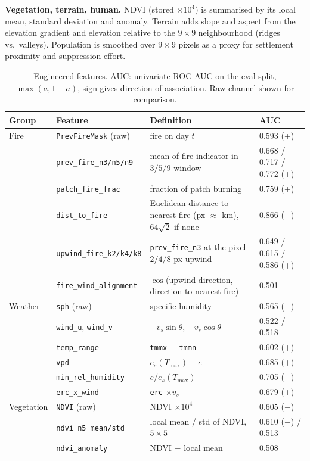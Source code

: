 \textbf{Vegetation, terrain, human.} NDVI (stored $\times10^4$) is summarised by its local mean,
standard deviation and anomaly. Terrain adds slope and aspect from the elevation gradient and
elevation relative to the $9\times9$ neighbourhood (ridges vs.\ valleys). Population is
smoothed over $9\times9$ pixels as a proxy for settlement proximity and suppression effort.

\begin{table}[t]
\centering
\caption{Engineered features. AUC: univariate ROC AUC on the eval split, $\max(a, 1-a)$,
sign gives direction of association. Raw channel shown for comparison.}
\label{tab:features}
\begin{tabular}{llll}
\hline
Group & Feature & Definition & AUC \\
\hline
Fire & \texttt{PrevFireMask} (raw) & fire on day $t$ & 0.593 (+) \\
 & \texttt{prev\_fire\_n3/n5/n9} & mean of fire indicator in $3/5/9$ window & 0.668 / 0.717 / 0.772 (+) \\
 & \texttt{patch\_fire\_frac} & fraction of patch burning & 0.759 (+) \\
 & \texttt{dist\_to\_fire} & Euclidean distance to nearest fire (px $\approx$ km), $64\sqrt2$ if none & 0.866 ($-$) \\
 & \texttt{upwind\_fire\_k2/k4/k8} & \texttt{prev\_fire\_n3} at the pixel $2/4/8$ px upwind & 0.649 / 0.615 / 0.586 (+) \\
 & \texttt{fire\_wind\_alignment} & $\cos$(upwind direction, direction to nearest fire) & 0.501 \\
\hline
Weather & \texttt{sph} (raw) & specific humidity & 0.565 ($-$) \\
 & \texttt{wind\_u}, \texttt{wind\_v} & $-v_s\sin\theta$, $-v_s\cos\theta$ & 0.522 / 0.518 \\
 & \texttt{temp\_range} & \texttt{tmmx} $-$ \texttt{tmmn} & 0.602 (+) \\
 & \texttt{vpd} & $e_s(T_{\max}) - e$ & 0.685 (+) \\
 & \texttt{min\_rel\_humidity} & $e / e_s(T_{\max})$ & 0.705 ($-$) \\
 & \texttt{erc\_x\_wind} & \texttt{erc} $\times v_s$ & 0.679 (+) \\
\hline
Vegetation & \texttt{NDVI} (raw) & NDVI $\times10^4$ & 0.605 ($-$) \\
 & \texttt{ndvi\_n5\_mean/std} & local mean / std of NDVI, $5\times5$ & 0.610 ($-$) / 0.513 \\
 & \texttt{ndvi\_anomaly} & NDVI $-$ local mean & 0.508 \\

\end{tabular}
\end{table}

